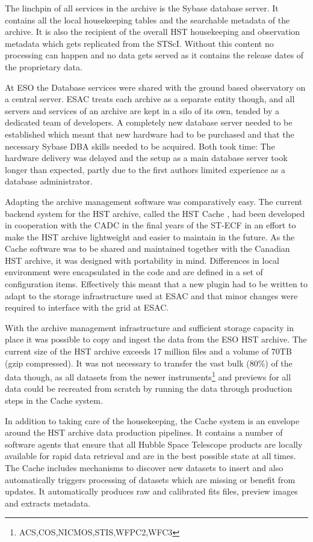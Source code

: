 The linchpin of all services in the archive is the Sybase database server. It contains all the local housekeeping tables and the searchable metadata of the archive. 
It is also the recipient of the overall HST housekeeping  and observation metadata which gets replicated from the STScI. Without this content no processing can happen and no data gets served as it contains the release dates of the proprietary data.
  
At ESO the Database services were shared with the ground based observatory on a central server. ESAC treats each archive as a separate entity though, and all servers and services of an archive are kept in a silo of its own, tended by a dedicated team of developers.
A completely new database server needed to be established which meant that new hardware had to be purchased and that the necessary Sybase DBA skills needed to be acquired. Both took time: The hardware delivery was delayed and the setup as a main database server took longer than expected, partly due to the first authors limited experience as a database administrator.

Adapting the archive management software was comparatively easy. The current backend system for the HST archive, called the HST Cache \citep{2010ASPC..434..275H},  had been developed in cooperation with the CADC in the final years of the ST-ECF in an effort to make the HST archive lightweight and easier to maintain in the future. As the Cache software was to be shared and maintained together with the Canadian HST archive, it was designed with portability in mind. Differences in local environment were encapsulated in the code and are defined in a set of configuration items. Effectively this meant that a new plugin had to be written to adapt to the storage infrastructure used at ESAC and that minor changes were required to interface with the grid at ESAC. 


With the archive management infrastructure and sufficient storage capacity in place it was possible to copy and ingest the data from the ESO HST archive.
The current size of the HST archive exceeds 17 million files and a volume of 70TB (gzip compressed). 
It was not necessary to transfer the vast bulk (80\%) of the data though, as all datasets from the newer instruments\footnote{ACS,COS,NICMOS,STIS,WFPC2,WFC3} and previews for all data could be recreated from scratch by running the data through production steps in the Cache system. 

In addition to taking care of the housekeeping, the Cache system is an envelope around the HST archive data production pipelines. It contains a number of software agents that ensure that all Hubble Space Telescope products are locally available for rapid data retrieval and are in the best possible state at all times.  
The Cache includes mechanisms to discover new datasets to insert and also automatically triggers processing of datasets which are missing or benefit from updates.
It automatically produces raw and calibrated fits files, preview images and extracts metadata.

